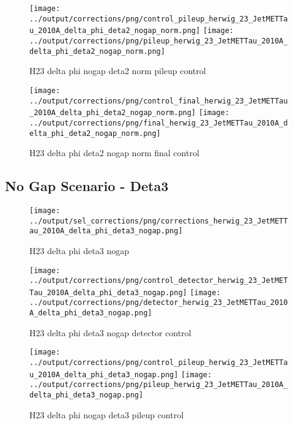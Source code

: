 \documentclass[11pt]{book}
\begin{document}
\begin{figure}[ht]
\centering
\texttt{[image: ../output/corrections/png/control\_pileup\_herwig\_23\_JetMETTau\_2010A\_delta\_phi\_deta2\_nogap\_norm.png]}
\texttt{[image: ../output/corrections/png/pileup\_herwig\_23\_JetMETTau\_2010A\_delta\_phi\_deta2\_nogap\_norm.png]}
\caption{H23 delta phi nogap deta2 norm pileup control}
\label{fig:H23_JetMETTau_2010A_delta_phi_deta2_nogap_norm_pileup_control}
\end{figure}


\begin{figure}[ht]
\centering
\texttt{[image: ../output/corrections/png/control\_final\_herwig\_23\_JetMETTau\_2010A\_delta\_phi\_deta2\_nogap\_norm.png]}
\texttt{[image: ../output/corrections/png/final\_herwig\_23\_JetMETTau\_2010A\_delta\_phi\_deta2\_nogap\_norm.png]}
\caption{H23 delta phi deta2 nogap norm final control}
\label{fig:H23_JetMETTau_2010A_delta_phi_deta2_nogap_norm_final_control}
\end{figure}


\clearpage
\subsection{No Gap Scenario - Deta3}
\begin{figure}[ht]
\centering
\texttt{[image: ../output/sel\_corrections/png/corrections\_herwig\_23\_JetMETTau\_2010A\_delta\_phi\_deta3\_nogap.png]}
\caption{H23 delta phi deta3 nogap}
\label{fig:H23_JetMETTau_2010A_delta_phi_deta3_nogap}
\end{figure}

\begin{figure}[ht]
\centering
\texttt{[image: ../output/corrections/png/control\_detector\_herwig\_23\_JetMETTau\_2010A\_delta\_phi\_deta3\_nogap.png]}
\texttt{[image: ../output/corrections/png/detector\_herwig\_23\_JetMETTau\_2010A\_delta\_phi\_deta3\_nogap.png]}
\caption{H23 delta phi deta3 nogap detector control}
\label{fig:H23_JetMETTau_2010A_delta_phi_deta3_nogap_detector_control}
\end{figure}

\begin{figure}[ht]
\centering
\texttt{[image: ../output/corrections/png/control\_pileup\_herwig\_23\_JetMETTau\_2010A\_delta\_phi\_deta3\_nogap.png]}
\texttt{[image: ../output/corrections/png/pileup\_herwig\_23\_JetMETTau\_2010A\_delta\_phi\_deta3\_nogap.png]}
\caption{H23 delta phi nogap deta3 pileup control}
\label{fig:H23_JetMETTau_2010A_delta_phi_deta3_nogap_pileup_control}
\end{figure}
\end{document}
